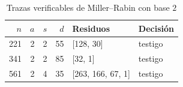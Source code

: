 \begin{table}[H]\centering\small
\caption{Trazas verificables de Miller--Rabin con base $2$}
\label{tab:trazas_propuesto1}
\begin{tabular}{rrrrll}\toprule
$n$ & $a$ & $s$ & $d$ & Residuos & Decisión \\
\midrule
221 & 2 & 2 & 55 & [128, 30] & testigo \\
341 & 2 & 2 & 85 & [32, 1] & testigo \\
561 & 2 & 4 & 35 & [263, 166, 67, 1] & testigo \\
\bottomrule\end{tabular}\end{table}
